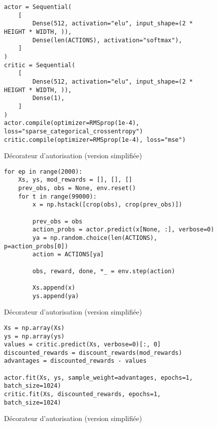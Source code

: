 

\renewcommand{\theFancyVerbLine}{
    \textcolor{mylinenumbercolor}{\ttfamily\arabic{FancyVerbLine}} %
}

\begin{figure}[!ht]
\centering
\begin{verbatim}
actor = Sequential(
    [
        Dense(512, activation="elu", input_shape=(2 * HEIGHT * WIDTH, )),
        Dense(len(ACTIONS), activation="softmax"),
    ]
)
critic = Sequential(
    [
        Dense(512, activation="elu", input_shape=(2 * HEIGHT * WIDTH, )),
        Dense(1),
    ]
)
actor.compile(optimizer=RMSprop(1e-4), loss="sparse_categorical_crossentropy")
critic.compile(optimizer=RMSprop(1e-4), loss="mse")
\end{verbatim}
\caption{Décorateur d'autorisation (version simplifiée)}
\label{fig:decorator}
\end{figure}


\begin{figure}[!ht]
\centering
\begin{verbatim}
for ep in range(2000):
    Xs, ys, mod_rewards = [], [], []
    prev_obs, obs = None, env.reset()
    for t in range(99000):
        x = np.hstack([crop(obs), crop(prev_obs)])

        prev_obs = obs
        action_probs = actor.predict(x[None, :], verbose=0)
        ya = np.random.choice(len(ACTIONS), p=action_probs[0])
        action = ACTIONS[ya]

        obs, reward, done, *_ = env.step(action)

        Xs.append(x)
        ys.append(ya)
\end{verbatim}
\caption{Décorateur d'autorisation (version simplifiée)}
\label{fig:decorator}
\end{figure}

\begin{figure}[!ht]
\centering
\begin{verbatim}
Xs = np.array(Xs)
ys = np.array(ys)
values = critic.predict(Xs, verbose=0)[:, 0]
discounted_rewards = discount_rewards(mod_rewards)
advantages = discounted_rewards - values

actor.fit(Xs, ys, sample_weight=advantages, epochs=1, batch_size=1024)
critic.fit(Xs, discounted_rewards, epochs=1, batch_size=1024)
\end{verbatim}
\caption{Décorateur d'autorisation (version simplifiée)}
\label{fig:decorator}
\end{figure}


